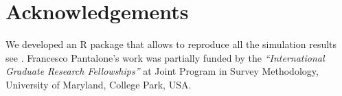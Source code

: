 \section*{Acknowledgements}
We developed an R package that allows to reproduce all the simulation results see \cite{gitSpatialInformativeSelection}. Francesco Pantalone's work was partially funded by the \emph{``International Graduate Research Fellowships''} at Joint Program in Survey Methodology, University of Maryland, College Park, USA.